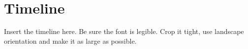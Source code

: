 \documentclass[onecolumn,10pt]{IEEEtran}
\newcommand{\myroot}{../}
\begin{document}


%





\appendix
\section{Timeline}\label{app:gantt}
Insert the timeline here. Be sure the font is legible. Crop it tight, use landscape orientation and make it as large as possible.

%
%
\end{document}
